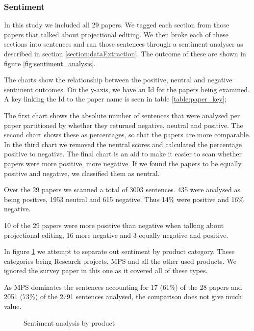 \subsubsection{Sentiment}

In this study we included all 29 papers.
We tagged each section from those papers that talked about projectional editing.
We then broke each of these sections into sentences and ran those sentences through a sentiment analyser as described in section \ref{section:dataExtraction}.
The outcome of these are shown in figure \ref{fig:sentiment_analysis}.

The charts show the relationship between the positive, neutral and negative sentiment outcomes.
On the y-axis, we have an Id for the papers being examined. 
A key linking the Id to the paper name is seen in table \ref{table:paper_key};

The first chart shows the absolute number of sentences that were analysed per paper partitioned by whether they returned negative, neutral and positive.
The second chart shows these as percentages, so that the papers are more comparable.
In the third chart we removed the neutral scores and calculated the percentage positive to negative.
The final chart is an aid to make it easier to scan whether papers were more positive, more negative.
If we found the papers to be equally positive and negative, we classified them as neutral.

Over the 29 papers we scanned a total of 3003 sentences.
435 were analysed as being positive, 1953 neutral and 615 negative.
Thus 14\% were positive and 16\% negative.

10 of the 29 papers were more positive than negative when talking about projectional editing, 16 more negative and 3 equally negative and positive.

In figure \ref{fig:sentiment_analysis2} we attempt to separate out sentiment by product category.  
These categories being Research projects, MPS and all the other used products.
We ignored the survey paper in this one as it covered all of these types.

As MPS dominates the sentences accounting for 17 (61\%) of the 28 papers and 2051 (73\%) of the 2791 sentences analysed, the comparison does not give much value.

\begin{figure}[h]
    \centering
    \caption{Sentiment analysis by product}
    \label{fig:sentiment_analysis2}
\end{figure}

